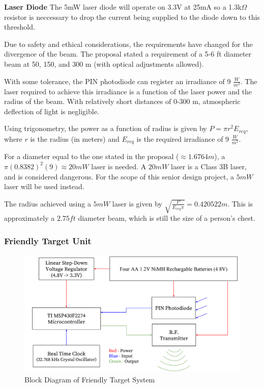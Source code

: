 \documentclass[letterpaper,10pt]{article}
\begin{document}
\begin{spacing}{1.15}
\normalsize\textbf{Laser Diode}
The 5mW laser diode will operate on 3.3V at 25mA so a 1.3k$\Omega$ resistor is neccessary to drop the current being supplied to the diode down to this threshold. 

Due to safety and ethical considerations, the requirements have changed for the divergence of the beam. The proposal stated a requirement of a 5-6 ft diameter beam at 50, 150, and 300 m (with optical adjustments allowed). 

With some tolerance, the PIN photodiode can register an irradiance of 9 $\frac{W}{m^2}$. The laser required to achieve this irradiance is a function of the laser power and the radius of the beam. With relatively short distances of 0-300 m, atmospheric deflection of light is negligible. 

Using trigonometry, the power as a function of radius is given by $P = \pi r^2  E_{req} $, where $r$ is the radius (in meters) and $E_{req}$ is the required irradiance of 9 $\frac{W}{m^2}$. 

For a diameter equal to the one stated in the proposal ($\approx 1.6764 m$), a $\pi (0.8382)^2(9) \approx 20 mW$ laser is needed. A $20 mW$ laser is a Class 3B laser, and is considered dangerous. For the scope of this senior design project, a $5mW$ laser will be used instead. 

The radius achieved using a $5 mW$ laser is given by $\sqrt{\frac{P}{E_{req} \pi}} = 0.420522 m$. This is approximately a $2.75 ft$ diameter beam, which is still the size of a person's chest.

\subsubsection{Friendly Target Unit}

\begin{figure} [H]
	\centering
	\includegraphics[scale=0.50]{Friendly_Target_Block_Diagram.png}
	\caption{Block Diagram of Friendly Target System\label{fig:friendly-target-block}}
\end{figure}


\end{spacing}
\end{document}
